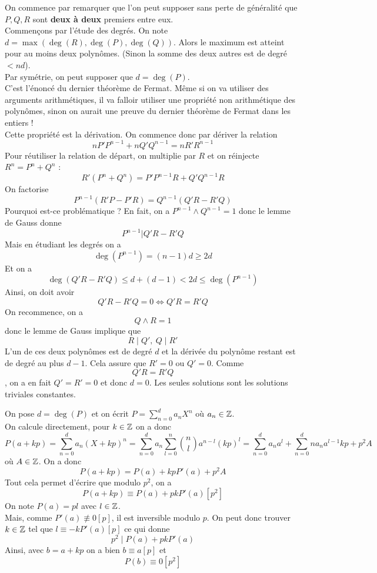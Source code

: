 \begin{sol}
On commence par remarquer que l'on peut supposer sans perte de généralité que $P,Q,R$ sont \textbf{deux à deux} premiers entre eux. \\
Commençons par l'étude des degrés. On note $d=\max (\deg(R),\deg(P),\deg(Q))$. Alors le maximum est atteint pour au moins deux polynômes. (Sinon la somme des deux autres est de degré $<nd$). \\
Par symétrie, on peut supposer que $d=\deg(P)$. \\
C'est l'énoncé du dernier théorème de Fermat. Même si on va utiliser des arguments arithmétiques, il va falloir utiliser une propriété non arithmétique des polynômes, sinon on aurait une preuve du dernier théorème de Fermat dans les entiers ! \\

Cette propriété est la dérivation. On commence donc par dériver la relation
$$nP'P^{n-1}+nQ'Q^{n-1}=nR'R^{n-1} $$
Pour réutiliser la relation de départ, on multiplie par $R$ et on réinjecte $R^n = P^n+Q^n$ :
$$R'(P^n+Q^n)=P'P^{n-1}R+Q'Q^{n-1}R $$
On factorise
$$P^{n-1}(R'P-P'R)=Q^{n-1}(Q'R-R'Q) $$
Pourquoi est-ce problématique ? En fait, on a $P^{n-1}\wedge Q^{n-1}=1$ donc le lemme de Gauss donne
$$P^{n-1}|Q'R-R'Q $$
Mais en étudiant les degrés on a
$$\deg(P^{n-1})=(n-1)d\ge 2d $$
Et on a
$$ \deg(Q'R-R'Q)\le d+(d-1)<2d\le \deg(P^{n-1})$$
Ainsi, on doit avoir
$$Q'R-R'Q=0\iff Q'R=R'Q $$
On recommence, on a
$$Q\wedge R=1 $$ donc le lemme de Gauss implique que
$$R\mid Q', \: Q\mid R' $$
L'un de ces deux polynômes est de degré $d$ et la dérivée du polynôme restant est de degré au plus $d-1$. Cela assure que $R'=0$ ou $Q'=0$. Comme
$$Q'R=R'Q $$, on a en fait $Q'=R'=0$ et donc $d=0$. Les seules solutions sont les solutions triviales constantes.
\end{sol}


\begin{sol}
On pose $d=\deg(P)$ et on écrit $P=\sum_{n=0}^da_nX^n$ où $a_n\in \mathbb Z$. \\
On calcule directement, pour $k\in \mathbb Z$ on a donc
$$P(a+kp)=\sum_{n=0}^da_n(X+kp)^n=\sum_{n=0}^da_n\sum_{l=0}^n\binom{n}{l}a^{n-l}(kp)^l =\sum_{n=0}^da_na^l+\sum_{n=0}^dna_na^{l-1}kp+p^2A$$
où $A\in \mathbb Z$. On a donc
$$P(a+kp)=P(a)+kpP'(a)+p^2A $$
Tout cela permet d'écrire que modulo $p^2$, on a
$$P(a+kp)\equiv P(a)+pkP'(a)[p^2] $$
On note $P(a)=pl$ avec $l\in \mathbb Z$. \\
Mais, comme $P'(a)\not\equiv 0[p]$, il est inversible modulo $p$. On peut donc trouver $k\in \mathbb Z$ tel que $l\equiv -kP'(a)[p]$ ce qui donne
$$p^2\mid P(a)+pkP'(a) $$
Ainsi, avec $b=a+kp$ on a bien $b\equiv a[p]$ et
$$P(b)\equiv 0[p^2] $$
\end{sol}


